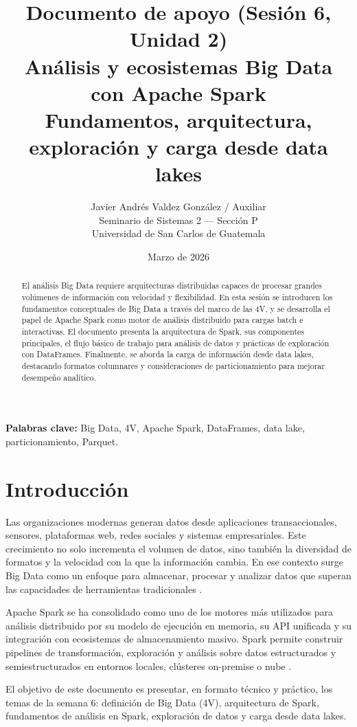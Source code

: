 \documentclass[12pt]{article}
\title{\textbf{Documento de apoyo (Sesión 6, Unidad 2)}\\
\large Análisis y ecosistemas Big Data con Apache Spark\\
\normalsize Fundamentos, arquitectura, exploración y carga desde data lakes}
\author{Javier Andrés Valdez González / Auxiliar \\
\small Seminario de Sistemas 2 --- Sección P \\
\small Universidad de San Carlos de Guatemala}
\date{Marzo de 2026}
\begin{document}
\maketitle

\begin{abstract}
El análisis Big Data requiere arquitecturas distribuidas capaces de procesar grandes volúmenes de información con velocidad y flexibilidad. En esta sesión se introducen los fundamentos conceptuales de Big Data a través del marco de las 4V, y se desarrolla el papel de Apache Spark como motor de análisis distribuido para cargas batch e interactivas. El documento presenta la arquitectura de Spark, sus componentes principales, el flujo básico de trabajo para análisis de datos y prácticas de exploración con DataFrames. Finalmente, se aborda la carga de información desde data lakes, destacando formatos columnares y consideraciones de particionamiento para mejorar desempeño analítico.
\end{abstract}

\textbf{Palabras clave:} Big Data, 4V, Apache Spark, DataFrames, data lake, particionamiento, Parquet.

\newpage
\tableofcontents

\section{Introducción}
Las organizaciones modernas generan datos desde aplicaciones transaccionales, sensores, plataformas web, redes sociales y sistemas empresariales. Este crecimiento no solo incrementa el volumen de datos, sino también la diversidad de formatos y la velocidad con la que la información cambia. En ese contexto surge Big Data como un enfoque para almacenar, procesar y analizar datos que superan las capacidades de herramientas tradicionales \cite{ibm_big_data}.

Apache Spark se ha consolidado como uno de los motores más utilizados para análisis distribuido por su modelo de ejecución en memoria, su API unificada y su integración con ecosistemas de almacenamiento masivo. Spark permite construir pipelines de transformación, exploración y análisis sobre datos estructurados y semiestructurados en entornos locales, clústeres on-premise o nube \cite{spark_docs_overview}.

El objetivo de este documento es presentar, en formato técnico y práctico, los temas de la semana 6: definición de Big Data (4V), arquitectura de Spark, fundamentos de análisis en Spark, exploración de datos y carga desde data lakes.
\end{document}
